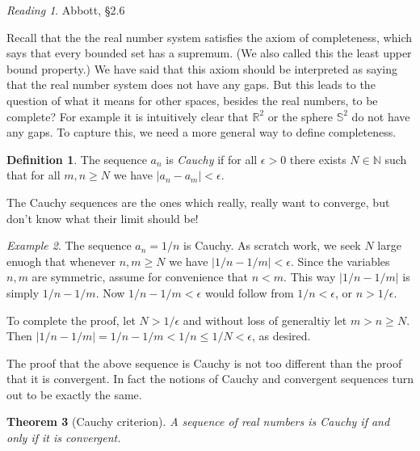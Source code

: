 \documentclass[11pt,oneside]{amsbook}
\newcommand{\N}{\mathbb N}
\newcommand{\R}{\mathbb R}
\theoremstyle{definition}
\theoremstyle{plain}
\newtheorem{theorem}{Theorem}[section]
\theoremstyle{definition}
\newtheorem{definition}[theorem]{Definition}
\theoremstyle{remark}
\newtheorem{example}[theorem]{Example}
\newtheorem*{reading}{Reading}
\numberwithin{equation}{section}
\numberwithin{figure}{section}
\begin{document}
\begin{reading}
  Abbott, \S 2.6
\end{reading}

Recall that the the real number system satisfies the axiom of completeness, which says that every bounded set has a supremum. (We also called this the least upper bound property.) We have said that this axiom should be interpreted as saying that the real number system does not have any gaps. But this leads to the question of what it means for other spaces, besides the real numbers, to be complete? For example it is intuitively clear that $\R^2$ or the sphere $\mathbb S^2$ do not have any gaps. To capture this, we need a more general way to define completeness.

\begin{definition}
  The sequence $a_n$ is \emph{Cauchy} if for all $\epsilon>0$ there exists $N\in\N$ such that for all $m,n\geq N$ we have $|a_n-a_m|<\epsilon$.
\end{definition}

The Cauchy sequences are the ones which really, really want to converge, but don't know what their limit should be!

\begin{example}
  The sequence $a_n=1/n$ is Cauchy. As scratch work, we seek $N$ large enuogh that whenever $n,m\geq N$ we have $|1/n-1/m|<\epsilon$. Since the variables $n,m$ are symmetric, assume for convenience that $n<m$. This way $|1/n-1/m|$ is simply $1/n-1/m$. Now $1/n-1/m<\epsilon$ would follow from $1/n<\epsilon$, or $n>1/\epsilon$.
  
  To complete the proof, let $N>1/\epsilon$ and without loss of generaltiy let $m>n\geq N$. Then $|1/n-1/m|=1/n-1/m<1/n\leq 1/N<\epsilon$, as desired.
\end{example}

The proof that the above sequence is Cauchy is not too different than the proof that it is convergent. In fact the notions of Cauchy and convergent sequences turn out to be exactly the same.

\begin{theorem}[Cauchy criterion]
  A sequence of real numbers is Cauchy if and only if it is convergent.
\end{theorem}
\end{document}
